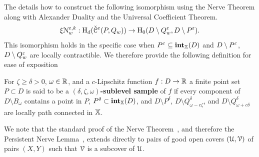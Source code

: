 The \fullversion details how to construct the following isomorphism using the Nerve Theorem along with Alexander Duality and the Universal Coefficient Theorem.
\[ \xi\mathcal{N}_w^{\varepsilon,k} : \mathrm{H}_d(\check{\mathcal{C}}^\varepsilon(P,Q_w))\to \mathrm{H}_0(D\setminus Q_w^\varepsilon, D\setminus P^\varepsilon).\]
This isomorphism holds in the specific case when $P^\varepsilon\subseteq \mathbf{int}_{\mathbb{X}}(D)$ and $D\setminus P^\varepsilon$, $D\setminus Q_w^\varepsilon$ are locally contractible.
We therefore provide the following definition for ease of exposition
\begin{definition}
  For $\zeta\geq \delta > 0$, $\omega\in\mathbb{R}$, and a $c$-Lipschitz function $f: D\to \mathbb{R}$ a finite point set $P\subset D$ is said to be a \textbf{$(\delta, \zeta, \omega)$-sublevel sample} of $f$ if every component of $D\setminus B_\omega$ contains a point in $P$, $P^\delta\subset\mathbf{int}_{\mathbb{X}}(D)$, and $D\setminus P^\delta$, $D\setminus Q_{\omega-c\zeta}^\delta$, and $D\setminus Q_{\omega+c\delta}^\delta$ are locally path connected in $\mathbb{X}$.
\end{definition}

We note that the standard proof of the Nerve Theorem~\cite{kozlov07combinatorial}, and therefore the Persistent Nerve Lemma~\cite{chazal08towards}, extends directly to pairs of good open covers $(\mathcal{U}, \mathcal{V})$ of pairs $(X, Y)$ such that $\mathcal{V}$ is a subcover of $\mathcal{U}$.

